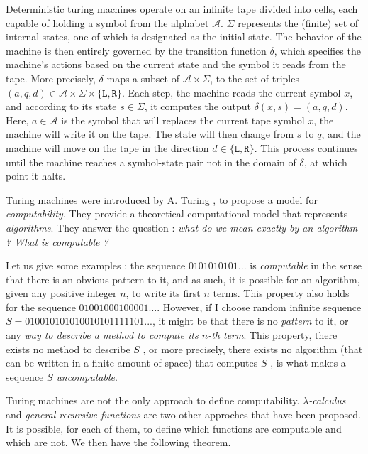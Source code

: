 Deterministic turing machines operate on an infinite tape divided into cells, each capable of holding a symbol from the alphabet $ \mathcal A $. $ \Sigma $ represents the (finite) set of internal states, one of which is designated as the initial state. The behavior of the machine is then entirely governed by the transition function $ \delta $, which specifies the machine's actions based on the current state and the symbol it reads from the tape. More precisely, $ \delta $ maps a subset of $ \mathcal A \times \Sigma $, to the set of triples $ (a, q, d) \in \mathcal A \times \Sigma \times \{ \texttt L, \texttt R \} $. Each step, the machine reads the current symbol $ x $, and according to its state $ s \in \Sigma $, it computes the output $ \delta(x,s) = (a, q, d) $. Here, $ a \in \mathcal A $ is the symbol that will replaces the current tape symbol $ x $, the machine will write it on the tape. The state will then change from $ s $ to $ q $, and the machine will move on the tape in the direction $ d \in \{ \texttt L, \texttt R\} $. This process continues until the machine reaches a symbol-state pair not in the domain of $ \delta $, at which point it halts.

Turing machines were introduced by A. Turing \cite{turing1936}, \cite{turing1992} to propose a model for \textit{computability}. They provide a theoretical computational model that represents \textit{algorithms}. They answer the question : \textit{what do we mean exactly by an algorithm ? What is computable ?} 

Let us give some examples : the sequence $ 0101010101... $ is \textit{computable} in the sense that there is an obvious pattern to it, and as such, it is possible for an algorithm, given any positive integer $ n $, to write its first $ n $ terms. This property also holds for the sequence $ 01001000100001 \dots $. However, if I choose \og random \fg infinite sequence $ S = 010010101010010101111101... $, it might be that there is no \textit{pattern} to it, or any \textit{way to describe a method to compute its $ n $-th term}. This property, \og there exists no method to describe $ S $ \fg, or more precisely, \og there exists no algorithm (that can be written in a finite amount of space) that computes $ S $ \fg, is what makes a sequence $ S $ \textit{uncomputable}.

Turing machines are not the only approach to define computability. \textit{$ \lambda $-calculus} and \textit{general recursive functions} are two other approches that have been proposed. It is possible, for each of them, to define which functions are computable and which are not. We then have the following theorem.

